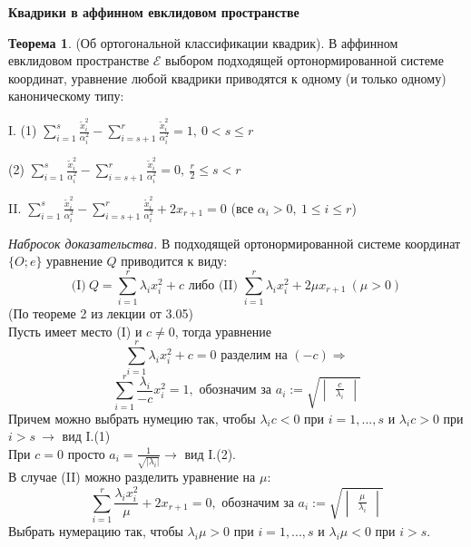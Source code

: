 \documentclass[a4paper, 12pt]{article}
\newcommand\tab[1][.5cm]{\hspace*{#1}}
\theoremstyle{definition}
\newtheorem*{theorem}{Теорема}
\begin{document}
    \begin{center}
        \textbf{Квадрики в аффинном евклидовом пространстве} 
    \end{center}
    \begin{theorem}
        (Об ортогональной классификации квадрик). В аффинном евклидовом пространстве $\mathcal{E}$ выбором подходящей ортонормированной системе координат, уравнение любой квадрики приводятся к одному (и только одному) каноническому типу:

        I. (1) $\sum\limits_{i=1}^{s} \frac{\widetilde{x}_i^2}{\alpha_i^2} - \sum\limits_{i=s + 1}^{r} \frac{\widetilde{x}_i^2}{\alpha_i^2} = 1,\ 0 < s \leq r$
        
        \tab[0.5cm](2) $\sum\limits_{i=1}^{s} \frac{\widetilde{x}_i^2}{\alpha_i^2} - \sum\limits_{i=s + 1}^{r} \frac{\widetilde{x}_i^2}{\alpha_i^2} = 0,\ \frac{r}{2} \leq s < r$

        II. $\sum\limits_{i=1}^{s} \frac{\widetilde{x}_i^2}{\alpha_i^2} - \sum\limits_{i=s + 1}^{r} \frac{\widetilde{x}_i^2}{\alpha_i^2} + 2x_{r+1}= 0$ (все $\alpha_i > 0,\ 1 \leq i \leq r$)
    \end{theorem}
    \textit{Набросок доказательства.} В подходящей ортонормированной системе координат $\{O;e\}$ уравнение $Q$ приводится к виду:
    $$\text{(I)}\ Q = \sum\limits_{i=1}^{r} \lambda_i x_i^2 + c \text{ либо (II) } \sum\limits_{i=1}^{r} \lambda_i x_i^2 + 2\mu x_{r+1}\ (\mu > 0)$$
    (По теореме 2 из лекции от 3.05)\\
    Пусть имеет место (I) и $c \neq 0$, тогда уравнение
    $$\sum\limits_{i=1}^{r} \lambda_ix_i^2 + c = 0 \text{ разделим на $(-c)$} \Longrightarrow $$
    $$\sum\limits_{i=1}^{r} \frac{\lambda_i}{-c} x_i^2 = 1, \text{ обозначим за } a_i := \sqrt{\begin{vmatrix}
    \frac{c}{\lambda_i}\end{vmatrix}}$$ 
    Причем можно выбрать нумецию так, чтобы $\lambda_ic < 0$ при $i = 1,...,s$ и $\lambda_ic > 0$ при $i > s\ \to $ вид I.(1)\\
    При $c = 0$ просто $a_i = \frac{1}{\sqrt{|\lambda_i|}} \to $ вид I.(2).\\
    В случае (II) можно разделить уравнение на $\mu$:
    $$\sum\limits_{i=1}^{r} \frac{\lambda_ix_i^2}{\mu} + 2x_{r+1} = 0, \text{ обозначим за } a_i := \sqrt{\begin{vmatrix}
        \frac{\mu}{\lambda_i}
    \end{vmatrix}}$$
    Выбрать нумерацию так, чтобы $\lambda_i \mu > 0$ при $i = 1,...,s$ и $\lambda_i \mu < 0$ при $i > s$.    
\end{document}
